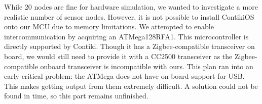 While 20 nodes are fine for hardware simulation, we wanted to investigate a more realistic number of sensor nodes. However, it is not possible to install ContikiOS onto our MCU due to memory limitations. We attempted to enable intercommunication by acquiring an ATMega128RFA1. This microcontroller is directly supported by Contiki. Though it has a Zigbee-compatible transceiver on board, we would still need to provide it with a CC2500 transceiver as the Zigbee-compatible onboard transceiver is incompatible with ours. This plan ran into an early critical problem: the ATMega does not have on-board support for USB. This makes getting output from them extremely difficult. A solution could not be found in time, so this part remains unfinished.
